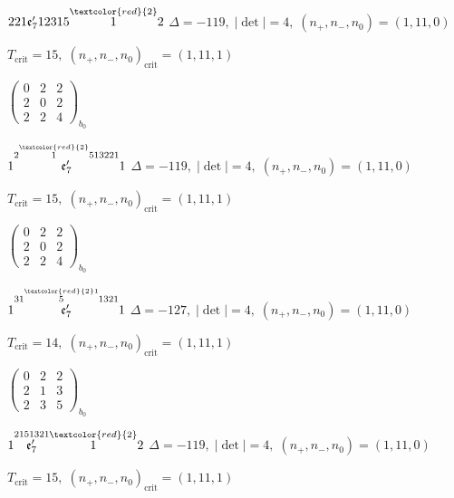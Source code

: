 \documentclass[10pt]{article}
\begin{document}
$221\mathfrak{e}_7'12315\overset{\textcolor{red}{2}}{1}2$ \quad $\Delta=-119,\; |\det|=4,\; (n_+,n_-,n_0)=(1,11,0)$

\hspace{1em}$T_{\text{crit}}=15,\; (n_+,n_-,n_0)_{\text{crit}}=(1,11,1)$

\hspace{2em}$\left(\begin{smallmatrix}0 & 2 & 2 \\ 2 & 0 & 2 \\ 2 & 2 & 4\end{smallmatrix}\right)_{\!b_0}$

\smallskip

$1\overset{2\overset{\textcolor{red}{2}}{1}513221}{\mathfrak{e}_7'}1$ \quad $\Delta=-119,\; |\det|=4,\; (n_+,n_-,n_0)=(1,11,0)$

\hspace{1em}$T_{\text{crit}}=15,\; (n_+,n_-,n_0)_{\text{crit}}=(1,11,1)$

\hspace{2em}$\left(\begin{smallmatrix}0 & 2 & 2 \\ 2 & 0 & 2 \\ 2 & 2 & 4\end{smallmatrix}\right)_{\!b_0}$

\smallskip

$1\overset{31\overset{\textcolor{red}{2}1}{5}1321}{\mathfrak{e}_7'}1$ \quad $\Delta=-127,\; |\det|=4,\; (n_+,n_-,n_0)=(1,11,0)$

\hspace{1em}$T_{\text{crit}}=14,\; (n_+,n_-,n_0)_{\text{crit}}=(1,11,1)$

\hspace{2em}$\left(\begin{smallmatrix}0 & 2 & 2 \\ 2 & 1 & 3 \\ 2 & 3 & 5\end{smallmatrix}\right)_{\!b_0}$

\smallskip

$1\overset{2151321}{\mathfrak{e}_7'}\overset{\textcolor{red}{2}}{1}2$ \quad $\Delta=-119,\; |\det|=4,\; (n_+,n_-,n_0)=(1,11,0)$

\hspace{1em}$T_{\text{crit}}=15,\; (n_+,n_-,n_0)_{\text{crit}}=(1,11,1)$
\end{document}
